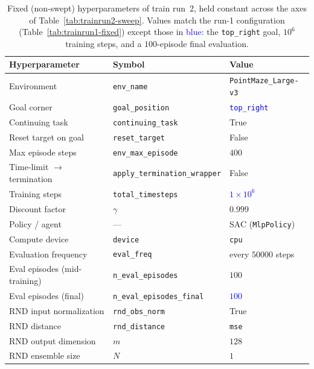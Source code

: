 \begin{table}[H]
\centering
\footnotesize
\setlength{\tabcolsep}{5pt}
\renewcommand{\arraystretch}{1.2}
\begin{tabular}{@{}>{\raggedright\arraybackslash}p{4.0cm} >{\raggedright\arraybackslash}p{4.6cm} >{\raggedright\arraybackslash}p{3.9cm}@{}}
\toprule
\textbf{Hyperparameter} & \textbf{Symbol} & \textbf{Value} \\
\midrule
Environment & \texttt{env\_name} & \texttt{PointMaze\_Large-v3} \\
Goal corner & \texttt{goal\_position} & \textcolor{blue}{\texttt{top\_right}} \\
Continuing task & \texttt{continuing\_task} & True \\
Reset target on goal & \texttt{reset\_target} & False \\
Max episode steps & \texttt{env\_max\_episode} & $400$ \\
Time-limit $\to$ termination & \texttt{apply\_\allowbreak termination\_\allowbreak wrapper} & False \\
\midrule
Training steps & \texttt{total\_timesteps} & \textcolor{blue}{$1\times10^{6}$} \\
Discount factor & $\gamma$ & $0.999$ \\
Policy / agent & --- & SAC (\texttt{MlpPolicy}) \\
Compute device & \texttt{device} & \texttt{cpu} \\
Evaluation frequency & \texttt{eval\_freq} & every $50000$ steps \\
Eval episodes (mid-training) & \texttt{n\_eval\_episodes} & $100$ \\
Eval episodes (final) & \texttt{n\_eval\_\allowbreak episodes\_\allowbreak final} & \textcolor{blue}{$100$} \\
\midrule
RND input normalization & \texttt{rnd\_obs\_norm} & True \\
RND distance & \texttt{rnd\_distance} & \texttt{mse} \\
RND output dimension & $m$ & $128$ \\
RND ensemble size & $N$ & $1$ \\
\bottomrule
\end{tabular}
\caption{Fixed (non-swept) hyperparameters of train run~2, held constant across the axes of
Table~\ref{tab:trainrun2-sweep}. Values match the run-1 configuration
(Table~\ref{tab:trainrun1-fixed}) except those in \textcolor{blue}{blue}: the \texttt{top\_right}
goal, $10^{6}$ training steps, and a $100$-episode final evaluation.}
\label{tab:trainrun2-fixed}
\end{table}


